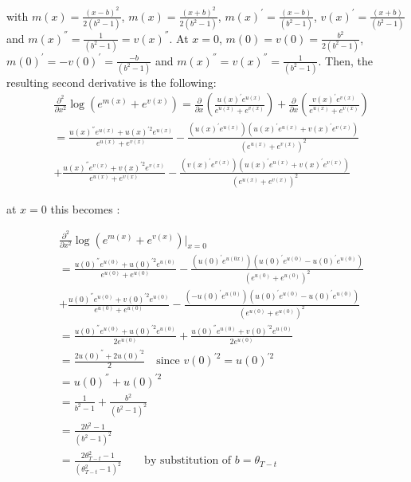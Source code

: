 with $m(x)=\frac{(x - b)^2}{2 (b^2 - 1)}$, $m(x)=\frac{(x + b)^2}{2 (b^2-1)}$, $m(x)^{'} =\frac{(x - b)}{(b^2-1)}$, $v(x)^{'}=\frac{(x + b)}{(b^2-1)}$ and $m(x)^{''} =\frac{1}{(b^2-1)}=v(x)^{''}$. At $x=0$, $m(0)=v(0)=\frac{b^2}{2 (b^2 - 1)}$, $m(0)^{'} =-v(0)^{'}=\frac{- b}{(b^2-1)}$ and $m(x)^{''}=v(x)^{''}=\frac{1}{(b^2-1)}$. Then, the resulting second derivative is the following:
\begin{align}
&\frac{\partial^2}{\partial x^2} \log{\left(e^{m(x)} + e^{v(x)} \right)} =\frac{\partial}{\partial x} \left(\frac{u(x)^{'} e^{u(x)}}{e^{u(x)} + e^{v(x)}}\right) + \frac{\partial}{\partial x} \left(\frac{v(x)^{'} e^{v(x)}}{e^{u(x)} + e^{v(x)}}\right) \nonumber \\
&= \frac{u(x)^{''} e^{u(x)} + u(x)^{'2} e^{u(x)}}{e^{u(x)} + e^{v(x)}} - \frac{(u(x)^{'} e^{u(x)}) (u(x)^{'}e^{u(x)} + v(x)^{'}e^{v(x)})}{(e^{u(x)} + e^{v(x)})^2} \nonumber \\
&+ \frac{u(x)^{''} e^{v(x)} + v(x)^{'2} e^{v(x)}}{e^{u(x)} + e^{v(x)}} - \frac{(v(x)^{'} e^{v(x)}) (u(x)^{'}e^{u(x)} + v(x)^{'}e^{v(x)})}{(e^{u(x)} + e^{v(x)})^2}
\end{align}

at $x=0$ this becomes :

\begin{align}
&\frac{\partial^2}{\partial x^2} \log{\left(e^{m(x)} + e^{v(x)} \right)}|_{x=0}\nonumber\\
&= \frac{u(0)^{''} e^{u(0)} + u(0)^{'2} e^{u(0)}}{e^{u(0)} + e^{u(0)}} - \frac{(u(0)^{'} e^{u(0x)}) (u(0)^{'}e^{u(0)} - u(0)^{'}e^{u(0)})}{(e^{u(0)} + e^{u(0)})^2} \nonumber\\
&+ \frac{u(0)^{''} e^{u(0)} + v(0)^{'2} e^{u(0)}}{e^{u(0)} + e^{u(0)}} - \frac{(-u(0)^{'} e^{u(0)}) (u(0)^{'}e^{u(0)} -u(0)^{'}e^{u(0)})}{(e^{u(0)} + e^{u(0)})^2}  \nonumber\\
&= \frac{u(0)^{''} e^{u(0)} + u(0)^{'2} e^{u(0)}}{2e^{u(0)}} +   \frac{u(0)^{''} e^{u(0)} + v(0)^{'2} e^{u(0)}}{2e^{u(0)}} \nonumber\\
&= \frac{2 u(0)^{''}  + 2 u(0)^{'2} }{2} \quad \text{since } v(0)^{'2} = u(0)^{'2}  \nonumber\\
&= u(0)^{''}  +  u(0)^{'2}  \nonumber\\
&= \frac{1}{b^2 - 1} + \frac{b^2}{(b^2 - 1)^2} \nonumber\\
&= \frac{2b^2-1}{(b^2-1)^2} \nonumber\\
&= \frac{2\theta_{T-t}^2-1}{(\theta_{T-t}^2-1)^2} \quad\quad \text{by substitution of } b=\theta_{T-t}
\end{align}


